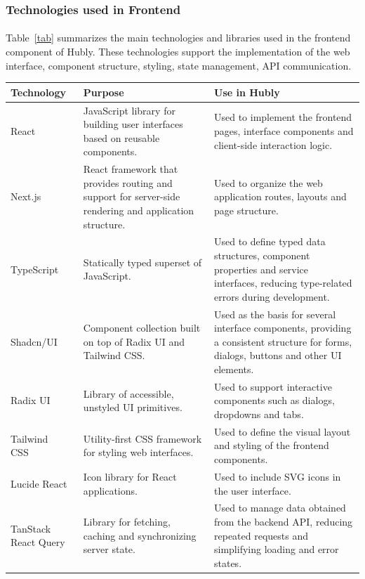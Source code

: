 \subsubsection{Technologies used in Frontend}
\paragraph{}Table~\ref{tab} summarizes the main technologies and libraries used in the frontend component of Hubly. These technologies support the implementation of the web interface, component structure, styling, state management, API communication.

\begin{table}[H]
\centering
\small
\begin{tabular}{|p{}|p{}|p{}|}
\hline
\textbf{Technology} & \textbf{Purpose} & \textbf{Use in Hubly} \\ \hline
React~\cite{react} & JavaScript library for building user interfaces based on reusable components. & Used to implement the frontend pages, interface components and client-side interaction logic. \\ \hline
Next.js~\cite{nextjs} & React framework that provides routing and support for server-side rendering and application structure. & Used to organize the web application routes, layouts and page structure. \\ \hline
TypeScript~\cite{typescript} & Statically typed superset of JavaScript. & Used to define typed data structures, component properties and service interfaces, reducing type-related errors during development. \\ \hline
Shadcn/UI & Component collection built on top of Radix UI and Tailwind CSS. & Used as the basis for several interface components, providing a consistent structure for forms, dialogs, buttons and other UI elements. \\ \hline
Radix UI~\cite{radixui} & Library of accessible, unstyled UI primitives. & Used to support interactive components such as dialogs, dropdowns and tabs. \\ \hline
Tailwind CSS~\cite{tailwindcss} & Utility-first CSS framework for styling web interfaces. & Used to define the visual layout and styling of the frontend components. \\ \hline
Lucide React~\cite{lucidereact} & Icon library for React applications. & Used to include SVG icons in the user interface. \\ \hline
TanStack React Query~\cite{reactquery} & Library for fetching, caching and synchronizing server state. & Used to manage data obtained from the backend API, reducing repeated requests and simplifying loading and error states. \\ \hline

\end{tabular}
\end{table}
